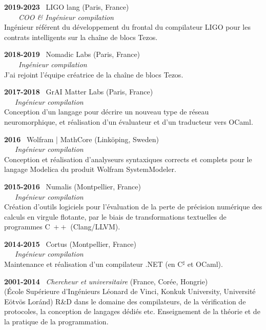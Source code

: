 \documentclass[a4paper,11pt]{article}
\newcommand{\cpp}{\mbox{C \hspace*{-2.5mm} \raise 0.7mm \hbox{${\scriptscriptstyle ++}$}}}
\begin{document}
\bigskip

\noindent\textbf{2019-2023} \ \textsf{LIGO lang} (Paris,
France)\\ \ \ \ \ \emph{COO \& Ingénieur compilation}\\ Ingénieur
référent du développement du frontal du compilateur LIGO pour les
contrats intelligents sur la chaîne de blocs Tezos.

\bigskip

\noindent\textbf{2018-2019} \ \textsf{Nomadic Labs} (Paris,
  France)\\ \ \ \ \ \emph{Ingénieur compilation}\\ J'ai rejoint
  l'équipe créatrice de la chaîne de blocs Tezos.

\bigskip

\noindent\textbf{2017-2018} \ \textsf{GrAI Matter Labs} (Paris,
France)\\ \ \ \ \emph{Ingénieur compilation}\\ Conception d'un langage
pour décrire un nouveau type de réseau neuromorphique, et réalisation
d'un évaluateur et d'un traducteur vers OCaml.

\newpage

\noindent\textbf{2016} \ \textsf{Wolfram | MathCore} (Link\"oping,
Sweden)\\ \ \ \ \emph{Ingénieur compilation}\\ Conception et
réalisation d'analyseurs syntaxiques corrects et complets pour le
langage Modelica du produit Wolfram SystemModeler.

\bigskip

\noindent\textbf{2015-2016} \ \textsf{Numalis} (Montpellier,
France)\\ \ \ \ \emph{Ingénieur compilation}\\ Création d'outils
logiciels pour l'évaluation de la perte de précision numérique des
calculs en virgule flotante, par le biais de transformations
textuelles de programmes \cpp{} (Clang/LLVM).

\bigskip

\noindent\textbf{2014-2015} \ \textsf{Cortus} (Montpellier,
France)\\ \ \ \ \emph{Ingénieur compilation}\\ Maintenance et
réalisation d'un compilateur .NET (en C$^\sharp$ et OCaml).

\bigskip

\noindent\textbf{2001-2014} \ \textsf{\emph{Chercheur et
  universitaire}} (France, Corée, Hongrie)\\ (\textsf{École
  Supérieure d'Ingénieurs Léonard de Vinci}, \textsf{Konkuk
  University}, \textsf{Université E\"otv\"os Lor\'and}) R\&D dans le
domaine des compilateurs, de la vérification de protocoles, la
conception de langages dédiés etc. Enseignement de la théorie et de la
pratique de la programmation.
\end{document}
